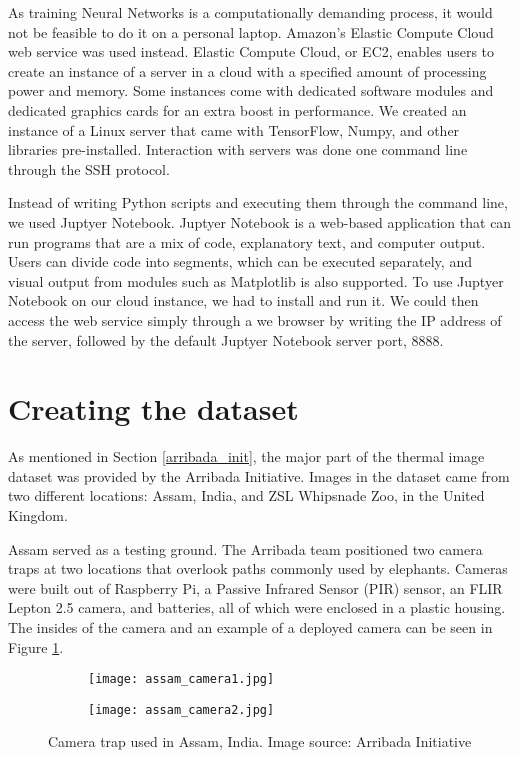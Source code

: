 As training Neural Networks is a computationally demanding process, it would not be feasible to do it on a personal laptop.
Amazon's Elastic Compute Cloud web service was used instead.
Elastic Compute Cloud, or EC2, enables users to create an instance of a server in a cloud with a specified amount of processing power and memory.
Some instances come with dedicated software modules and dedicated graphics cards for an extra boost in performance.
We created an instance of a Linux server that came with TensorFlow, Numpy, and other libraries pre-installed.
Interaction with servers was done one command line through the SSH protocol.

Instead of writing Python scripts and executing them through the command line, we used Juptyer Notebook. 
Juptyer Notebook is a web-based application that can run programs that are a mix of code, explanatory text, and computer output.
Users can divide code into segments, which can be executed separately, and visual output from modules such as Matplotlib is also supported.
To use Juptyer Notebook on our cloud instance, we had to install and run it.
We could then access the web service simply through a we browser by writing the IP address of the server, followed by the default Juptyer Notebook server port, 8888.


\section{ Creating the dataset}

As mentioned in Section \ref{arribada_init}, the major part of the thermal image dataset was provided by the Arribada Initiative\cite{wildlabs-winners}\cite{arribada-assam}.
Images in the dataset came from two different locations: Assam, India, and ZSL Whipsnade Zoo, in the United Kingdom.

Assam served as a testing ground.
The Arribada team positioned two camera traps at two locations that overlook paths commonly used by elephants.
Cameras were built out of Raspberry Pi, a Passive Infrared Sensor (PIR) sensor, an FLIR Lepton 2.5 camera, and batteries, all of which were enclosed in a plastic housing.
The insides of the camera and an example of a deployed camera can be seen in Figure \ref{assam_camera}.

\begin{figure}[ht]
    \begin{subfigure}{0.5\textwidth}
        \centering
        \texttt{[image: assam\_camera1.jpg]} 
    \end{subfigure}
    \begin{subfigure}{0.5\textwidth}
        \centering
        \texttt{[image: assam\_camera2.jpg]}
    \end{subfigure}
    \caption[Camera trap used in Assam, India.]{Camera trap used in Assam, India. Image source: Arribada Initiative\cite{arribada-assam}}
    \label{assam_camera}
\end{figure}

